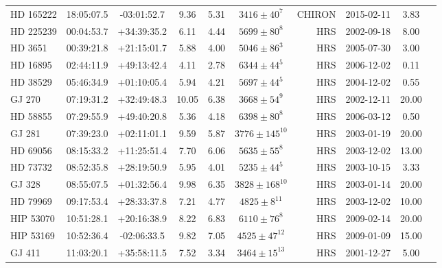 \begin{scriptsize}
\begin{longtable}{lcccccrccc}
   HD 165222 &   18:05:07.5 &   -03:01:52.7 &   9.36 &  5.31 &     $3416 \pm 40^{7}$ &      CHIRON &      2015-02-11 &              3.83  \\
  HD 225239 &   00:04:53.7 &   +34:39:35.2 &   6.11 &  4.44 &     $5699 \pm 80^{8}$ &         HRS &      2002-09-18 &              8.00  \\
    HD 3651 &   00:39:21.8 &   +21:15:01.7 &   5.88 &  4.00 &     $5046 \pm 86^{3}$ &         HRS &      2005-07-30 &              3.00  \\
   HD 16895 &   02:44:11.9 &   +49:13:42.4 &   4.11 &  2.78 &     $6344 \pm 44^{5}$ &         HRS &      2006-12-02 &              0.11  \\
   HD 38529 &   05:46:34.9 &   +01:10:05.4 &   5.94 &  4.21 &     $5697 \pm 44^{5}$ &         HRS &      2004-12-02 &              0.55  \\
     GJ 270 &   07:19:31.2 &   +32:49:48.3 &  10.05 &  6.38 &     $3668 \pm 54^{9}$ &         HRS &      2002-12-11 &             20.00  \\
   HD 58855 &   07:29:55.9 &   +49:40:20.8 &   5.36 &  4.18 &     $6398 \pm 80^{8}$ &         HRS &      2006-03-12 &              0.50  \\
     GJ 281 &   07:39:23.0 &   +02:11:01.1 &   9.59 &  5.87 &   $3776 \pm 145^{10}$ &         HRS &      2003-01-19 &             20.00  \\
   HD 69056 &   08:15:33.2 &   +11:25:51.4 &   7.70 &  6.06 &     $5635 \pm 55^{8}$ &         HRS &      2003-12-02 &             13.00  \\
   HD 73732 &   08:52:35.8 &   +28:19:50.9 &   5.95 &  4.01 &     $5235 \pm 44^{5}$ &         HRS &      2003-10-15 &              3.33  \\
     GJ 328 &   08:55:07.5 &   +01:32:56.4 &   9.98 &  6.35 &   $3828 \pm 168^{10}$ &         HRS &      2003-01-14 &             20.00  \\
   HD 79969 &   09:17:53.4 &   +28:33:37.8 &   7.21 &  4.77 &     $4825 \pm 8^{11}$ &         HRS &      2003-12-02 &             10.00  \\
 HIP 53070 &   10:51:28.1 &   +20:16:38.9 &   8.22 &  6.83 &     $6110 \pm 76^{8}$ &         HRS &      2009-02-14 &             20.00  \\
 HIP 53169 &   10:52:36.4 &   -02:06:33.5 &   9.82 &  7.05 &    $4525 \pm 47^{12}$ &         HRS &      2009-01-09 &             15.00  \\
      GJ 411 &   11:03:20.1 &   +35:58:11.5 &   7.52 &  3.34 &    $3464 \pm 15^{13}$ &         HRS &      2001-12-27 &              5.00  \\

\end{longtable}
\end{scriptsize}
